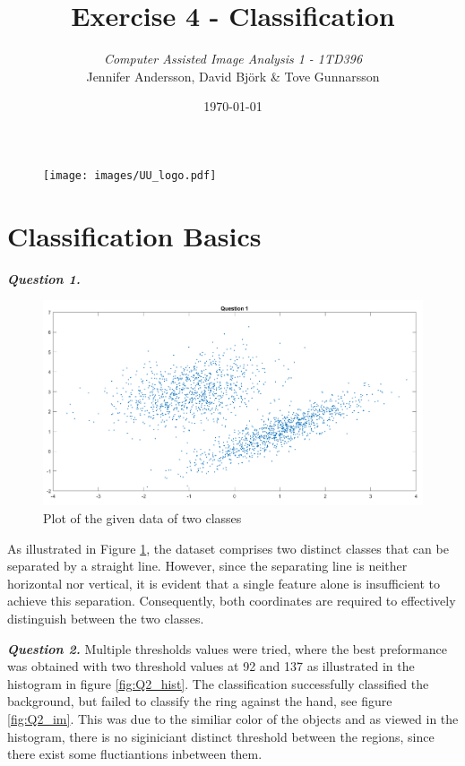 \documentclass[12pt]{article}
\title{Exercise 4  - Classification}
\author{\textit{Computer Assisted Image Analysis 1  - 1TD396}  \vspace{1cm} \\
         Jennifer Andersson, David Björk \& Tove Gunnarsson \vspace{0.7cm}\\
        }
\date{\today}
\begin{document}
\maketitle

\begin{figure}[b]
  \centering
  \texttt{[image: images/UU\_logo.pdf]}
\end{figure}
\thispagestyle{empty}

\clearpage

\newpage
\section{Classification Basics}


\textbf{\emph{Question 1.}}

\begin{figure}[htbp!]
  \centering
  \includegraphics[width = 15cm]{images/Q1.png}
  \caption{Plot of the given data of two classes}
  \label{fig:Q1}
\end{figure}

As illustrated in Figure \ref{fig:Q1}, the dataset comprises two distinct classes that can be separated by a straight line. However, since the separating line is neither horizontal nor vertical, it is evident that a single feature alone is insufficient to achieve this separation. Consequently, both coordinates are required to effectively distinguish between the two classes.

\textbf{\emph{Question 2.}}
Multiple thresholds values were tried, where the best preformance was obtained with two threshold values at 92 and 137 as illustrated in the histogram in figure \ref{fig:Q2_hist}. The classification successfully classified the background, but failed to classify the ring against the hand, see figure \ref{fig:Q2_im}. This was due to the similiar color of the objects and as viewed in the histogram,  there is no siginiciant distinct threshold between the regions, since there exist some fluctiantions inbetween them. 
\end{document}
